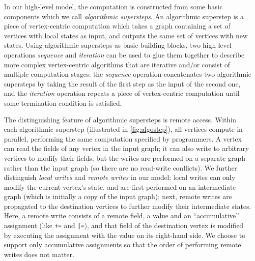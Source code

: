 \documentclass{sokendai_thesis} %
\begin{document}
In our high-level model, the computation is constructed from some basic components which we call \emph{algorithmic supersteps}.
An algorithmic superstep is a piece of vertex-centric computation which takes a graph containing a set of vertices with local states as input, and outputs the same set of vertices with new states.
Using algorithmic supersteps as basic building blocks, two high-level operations \emph{sequence} and \emph{iteration} can be used to glue them together to describe more complex vertex-centric algorithms that are iterative and/or consist of multiple computation stages:
the \emph{sequence} operation concatenates two algorithmic supersteps by taking the result of the first step as the input of the second one, and the \emph{iteration} operation repeats a piece of vertex-centric computation until some termination condition is satisfied.

The distinguishing feature of algorithmic supersteps is remote access.
Within each algorithmic superstep (illustrated in \autoref{fig:algostep}), all vertices compute in parallel, performing the same computation specified by programmers.
A vertex can read the fields of any vertex in the input graph; it can also write to arbitrary vertices to modify their fields, but the writes are performed on a separate graph rather than the input graph (so there are no read-write conflicts).
We further distinguish \emph{local writes} and \emph{remote writes} in our model:
local writes can only modify the current vertex's state, and are first performed on an intermediate graph (which is initially a copy of the input graph);
next, remote writes are propagated to the destination vertices to further modify their intermediate states.
Here, a remote write consists of a remote field, a value and an ``accumulative'' assignment (like \texttt{+=} and \texttt{|=}), and that field of the destination vertex is modified by executing the assignment with the value on its right-hand side.
We choose to support only accumulative assignments so that the order of performing remote writes does not matter.
\end{document}
